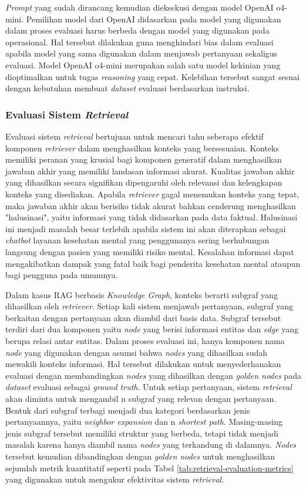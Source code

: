 \textit{Prompt} yang sudah dirancang kemudian dieksekusi dengan model OpenAI o4-mini.
Pemilihan model dari OpenAI didasarkan pada model yang digunakan dalam proses evaluasi harus berbeda dengan model yang digunakan pada operasional.
Hal tersebut dilakukan guna menghindari bias dalam evaluasi apabila model yang sama digunakan dalam menjawab pertanyaan sekaligus evaluasi.
Model OpenAI o4-mini merupakan salah satu model kekinian yang dioptimalkan untuk tugas \textit{reasoning} yang cepat.
Kelebihan tersebut sangat sesuai dengan kebutuhan membuat \textit{dataset} evaluasi berdasarkan instruksi.

\subsubsection{Evaluasi Sistem \textit{Retrieval}}
Evaluasi sistem \textit{retrieval} bertujuan untuk mencari tahu seberapa efektif komponen \textit{retriever} dalam menghasilkan konteks yang bersesuaian.
Konteks memiliki peranan yang krusial bagi komponen generatif dalam menghasilkan jawaban akhir yang memiliki landasan informasi akurat.
Kualitas jawaban akhir yang dihasilkan secara signifikan dipengaruhi oleh relevansi dan kelengkapan konteks yang disediakan.
Apabila \textit{retriever} gagal menemukan konteks yang tepat, maka jawaban akhir akan berisiko tidak akurat bahkan cenderung menghasilkan "halusinasi", yaitu informasi yang tidak didasarkan pada data faktual.
Halusinasi ini menjadi masalah besar terlebih apabila sistem ini akan diterapkan sebagai \textit{chatbot} layanan kesehatan mental yang penggunanya sering berhubungan langsung dengan pasien yang memiliki risiko mental.
Kesalahan informasi dapat mengakibatkan dampak yang fatal baik bagi penderita kesehatan mental ataupun bagi pengguna pada umumnya.

Dalam kasus RAG berbasis \textit{Knowledge Graph}, konteks berarti subgraf yang dihasilkan oleh \textit{retriever}.
Setiap kali sistem menjawab pertanyaan, subgraf yang berkaitan dengan pertanyaan akan diambil dari basis data.
Subgraf tersebut terdiri dari dua komponen yaitu \textit{node} yang berisi informasi entitas dan \textit{edge} yang berupa relasi antar entitas.
Dalam proses evaluasi ini, hanya komponen nama  \textit{node} yang digunakan dengan asumsi bahwa \textit{nodes} yang dihasilkan sudah mewakili konteks informasi.
Hal tersebut dilakukan untuk menyederhanakan evaluasi dengan membandingkan \textit{nodes} yang dihasilkan dengan \textit{golden nodes} pada \textit{dataset} evaluasi sebagai \textit{ground truth}.
Untuk setiap pertanyaan, sistem \textit{retrieval} akan diminta untuk mengambil n subgraf yang relevan dengan pertanyaan.
Bentuk dari subgraf terbagi menjadi dua kategori berdasarkan jenis pertanyaannya, yaitu \textit{neighbor expansion} dan n \textit{shortest path}.
Masing-masing jenis subgraf tersebut memiliki struktur yang berbeda, tetapi tidak menjadi masalah karena hanya diambil nama \textit{nodes} yang terkandung di dalamnya.
\textit{Nodes} tersebut kemudian dibandingkan dengan \textit{golden nodes} untuk menghasilkan sejumlah metrik kuantitatif seperti pada Tabel \ref{tab:retrieval-evaluation-metrics} yang digunakan untuk mengukur efektivitas sistem \textit{retrieval}.

